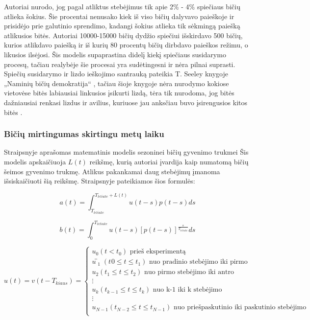 \documentclass{VUMIFKompMagistrinis}
\begin{document}
Autoriai nurodo, jog pagal atliktus stebėjimus \cite{SeB99} tik apie 2\% - 4\% spiečiaus bičių atlieka šokius. Šie procentai nenusako kiek iš viso bičių dalyvavo paieškoje ir prisidėjo prie galutinio sprendimo, kadangi šokius atlieka tik sėkmingą paiešką atlikusios bitės. Autoriai 10000-15000 bičių dydžio spiečiui išskirdavo 500 bičių, kurios atlikdavo paiešką ir iš kurių 80 procentų bičių dirbdavo paieškos režimu, o likusios ilsėjosi.
Šis modelis supaprastina didelį kiekį spiečiaus susidarymo procesų, tačiau realybėje šie procesai yra sudėtingesni ir nėra pilnai suprasti. Spiečių susidarymo ir lizdo ieškojimo santrauką pateikia T. Seeley knygoje „Naminių bičių demokratija“ \cite{See10}, tačiau šioje knygoje nėra nurodymo kokiose vietovėse bitės labiausiai linkusios įsikurti lizdą, tėra tik nurodoma, jog bitės dažniausiai renkasi lizdus ir avilius, kuriuose jau anksčiau buvo įsirengusios kitos bitės \cite{VMS85}. 




\subsubsection{Bičių mirtingumas skirtingu metų laiku}

 Straipsnyje aprašomas matematinis modelis sezoninei bičių gyvenimo trukmei \cite{YYY19}
Šis modelis apskaičiuoja $L(t)$ reikšmę, kurią autoriai įvardija kaip numatomą bičių šeimos gyvenimo trukmę. Atlikus pakankamai daug stebėjimų įmanoma išsiskaičiuoti šią reikšmę. Straipsnyje pateikiamos šios formulės:

\begin{equation}
\label{emir1}
a(t)=\int_{T_{leliuke}}^{T_{leliuke}+L(t)}u(t-s)p(t-s)ds
\end{equation}

\begin{equation}
\label{emir2}
b(t)=\int_{0}^{T_{leliuke}}u(t-s)[p(t-s)]^{\frac{s}{T_{leliuke}}}ds
\end{equation}


\begin{equation}
\label{emir3}
u(t)=v(t-T_{kiaus} )=
\begin{cases}
u_{0} (t<t_0 )  \text { prieš eksperimentą   }                                          \\
u ̅_{1} (t_{}0≤t≤t_{1} )  \text { nuo pradinio stebėjimo iki pirmo }                           \\
u_{2} (t_{1}≤t≤t_{2} )  \text { nuo pirmo stebėjimo iki antro }                               \\
\vdots \\
u_{k} (t_{k-1}≤t≤t_{k} )  \text { nuo k-1 iki k stebėjimo }                               \\
\vdots \\
u_{N-1} (t_{N-2}≤t≤t_{N-1} )  \text { nuo priešpaskutinio iki paskutinio stebėjimo } \\
\end{cases}
\end{equation}
\end{document}
